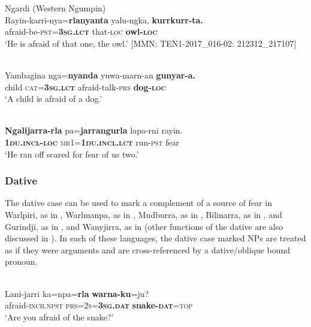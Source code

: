 \documentclass[output=paper,colorlinks,citecolor=brown]{langscibook}
\begin{document}
\ea 
\textnormal{Ngardi (Western Ngumpin)} \\
\gll Rayin-karri-nya=\textbf{rlanyanta} yalu-ngka, \textbf{kurrkurr-ta.} \\
afraid-be-\textsc{pst=\textbf{3sg.lct}} that-\textsc{loc} \textbf{owl-\textsc{loc}} \\
\glt `He is afraid of that one, the owl.' $[$MMN: TEN1-2017\_016-02: 212312\_217107$]$
\label{ex:bro30}
\z


\ea 
{} \\
\gll Yambagina nga=\textbf{nyanda} yuwa-marn-an \textbf{gunyar-a.} \\
child \textsc{cat=\textbf{3sg.lct}} afraid-talk-\textsc{prs} \textbf{dog-\textsc{loc}} \\
\glt `A child is afraid of a dog.'
\label{ex:bro31}
\z


\ea 
{} \\
\gll \textbf{Ngalijarra-rla} pa=\textbf{jarrangurla} lapa-rni rayin. \\
\textbf{\textsc{1du.incl-loc}} \textsc{mr1=\textbf{1du.incl.lct}} run-\textsc{pst} fear \\
\glt `He ran off scared for fear of us two.'
\label{ex:bro32}
\z



\subsubsection{Dative}
\label{subsubsec:dative}

The dative case can be used to mark a complement of a source of fear in Warlpiri, as in , Warlmanpa, as in , Mudburra, as in , Bilinarra, as in , and Gurindji, as in , and Wanyjirra, as in  (other functions of the dative are also discussed in ). In each of these languages, the dative case marked NPs are treated as if they were arguments and are cross-referenced by a dative/oblique bound pronoun.

\ea
{} \\
\gll Lani-jarri ka=npa=\textbf{rla} \textbf{warna-ku}=ju? \\
afraid-\textsc{inch.npst} \textsc{prs=2s=\textbf{3sg.dat}} \textbf{snake-\textsc{dat}}=\textsc{top} \\
\glt `Are you afraid of the snake?'
\label{ex:bro33}
\z
\end{document}

